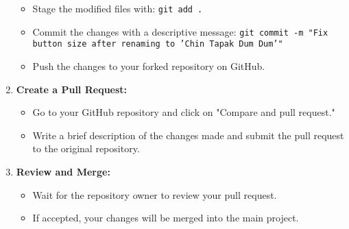 \documentclass[a4paper,12pt]{article}
\begin{document}
\begin{enumerate}
    \begin{itemize}
        \item Stage the modified files with: \texttt{git add .}
        \item Commit the changes with a descriptive message: \texttt{git commit -m "Fix button size after renaming to 'Chin Tapak Dum Dum'"}
        \item Push the changes to your forked repository on GitHub.
    \end{itemize}
    \item \textbf{Create a Pull Request:}
    \begin{itemize}
        \item Go to your GitHub repository and click on "Compare and pull request."
        \item Write a brief description of the changes made and submit the pull request to the original repository.
    \end{itemize}
    \item \textbf{Review and Merge:}
    \begin{itemize}
        \item Wait for the repository owner to review your pull request.
        \item If accepted, your changes will be merged into the main project.
    \end{itemize}
\end{enumerate}
\end{document}
